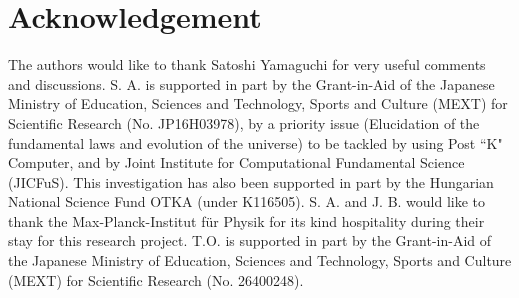 \documentclass[preprint]{ptephy_v1}%
\begin{document}
\section*{Acknowledgement}
The authors  would like to thank Satoshi Yamaguchi for very useful comments and discussions.
S. A. is supported in part by the Grant-in-Aid of the Japanese Ministry of Education, Sciences and Technology, Sports and Culture (MEXT) for Scientific Research (No. JP16H03978),  
by a priority issue (Elucidation of the fundamental laws and evolution of the universe) to be tackled by using Post ``K" Computer, 
and by Joint Institute for Computational Fundamental Science (JICFuS).
This investigation has also been supported in part by the Hungarian 
National Science Fund OTKA (under K116505).
S. A. and J. B. would like to thank the Max-Planck-Institut f\"ur Physik 
for its kind hospitality during their stay for this research project.
T.O. is supported in part by the Grant-in-Aid of the Japanese 
Ministry of Education, Sciences and Technology, 
Sports and Culture (MEXT) for Scientific Research (No. 26400248).


%
%
%
\end{document}
